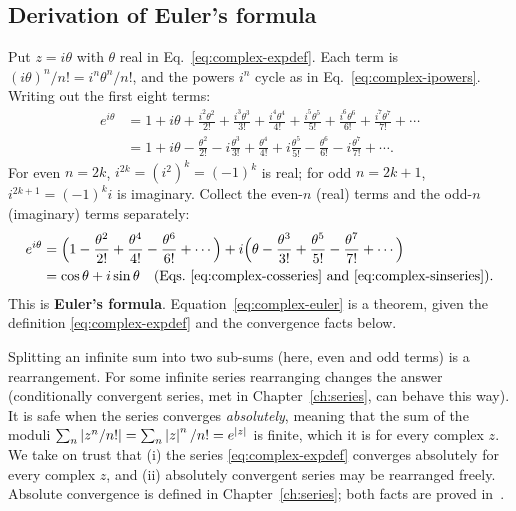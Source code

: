 \subsection{Derivation of Euler's formula}

Put $z=i\theta$ with $\theta$ real in Eq.~\eqref{eq:complex-expdef}. Each term is $(i\theta)^n/n!=i^n\theta^n/n!$, and the powers $i^n$ cycle as in Eq.~\eqref{eq:complex-ipowers}. Writing out the first eight terms:
\begin{align*}
e^{i\theta}&=1+i\theta+\frac{i^2\theta^2}{2!}+\frac{i^3\theta^3}{3!}+\frac{i^4\theta^4}{4!}+\frac{i^5\theta^5}{5!}+\frac{i^6\theta^6}{6!}+\frac{i^7\theta^7}{7!}+\cdots\\
&=1+i\theta-\frac{\theta^2}{2!}-i\frac{\theta^3}{3!}+\frac{\theta^4}{4!}+i\frac{\theta^5}{5!}-\frac{\theta^6}{6!}-i\frac{\theta^7}{7!}+\cdots .
\end{align*}
For even $n=2k$, $i^{2k}=(i^2)^k=(-1)^k$ is real; for odd $n=2k+1$, $i^{2k+1}=(-1)^k i$ is imaginary. Collect the even-$n$ (real) terms and the odd-$n$ (imaginary) terms separately:
\begin{align}
e^{i\theta}&=\Bigl(1-\frac{\theta^2}{2!}+\frac{\theta^4}{4!}-\frac{\theta^6}{6!}+\cdots\Bigr)+i\Bigl(\theta-\frac{\theta^3}{3!}+\frac{\theta^5}{5!}-\frac{\theta^7}{7!}+\cdots\Bigr)\nonumber\\
&=\cos\theta+i\sin\theta\quad\text{(Eqs.~\eqref{eq:complex-cosseries} and \eqref{eq:complex-sinseries})}.\label{eq:complex-euler}
\end{align}
This is \textbf{Euler's formula}. Equation~\eqref{eq:complex-euler} is a theorem, given the definition \eqref{eq:complex-expdef} and the convergence facts below.

\begin{beyond}
Splitting an infinite sum into two sub-sums (here, even and odd terms) is a rearrangement. For some infinite series rearranging changes the answer (conditionally convergent series, met in Chapter~\ref{ch:series}, can behave this way). It is safe when the series converges \emph{absolutely}, meaning that the sum of the moduli $\sum_n\left\lvert z^n/n!\right\rvert=\sum_n\left\lvert z\right\rvert^n/n!=e^{\left\lvert z\right\rvert}$ is finite, which it is for every complex $z$. We take on trust that (i) the series \eqref{eq:complex-expdef} converges absolutely for every complex $z$, and (ii) absolutely convergent series may be rearranged freely. Absolute convergence is defined in Chapter~\ref{ch:series}; both facts are proved in~\cite{rhb}.
\end{beyond}

